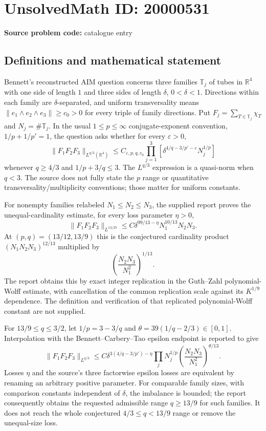 \documentclass[11pt]{article}
\newcommand{\R}{\mathbb{R}}
\begin{document}
\section*{UnsolvedMath ID: 20000531}
\textbf{Source problem code:} catalogue entry
\subsection{Definitions and mathematical statement}
Bennett's reconstructed AIM question concerns three families $\mathbb T_j$ of tubes in $\R^4$ with one side of length $1$ and three sides of length $\delta$, $0<\delta<1$. Directions within each family are $\delta$-separated, and uniform transversality means $\|e_1\wedge e_2\wedge e_3\|\geq c_0>0$ for every triple of family directions. Put $F_j=\sum_{T\in\mathbb T_j}\chi_T$ and $N_j=\#\mathbb T_j$. In the usual $1\leq p\leq\infty$ conjugate-exponent convention, $1/p+1/p'=1$, the question asks whether for every $\varepsilon>0$,
\[
 \|F_1F_2F_3\|_{L^{q/3}(\R^4)}\leq C_{\varepsilon,p,q,c_0}
 \prod_{j=1}^3\left[\delta^{4/q-3/p'-\varepsilon}N_j^{1/p}\right]
\]
whenever $q\geq4/3$ and $1/p+3/q\leq3$. The $L^{q/3}$ expression is a quasi-norm when $q<3$. The source does not fully state the $p$ range or quantitative transversality/multiplicity conventions; those matter for uniform constants.

For nonempty families relabeled $N_1\leq N_2\leq N_3$, the supplied report proves the unequal-cardinality estimate, for every loss parameter $\eta>0$,
\[
 \|F_1F_2F_3\|_{L^{13/27}}
 \leq C\delta^{99/13-\eta}N_1^{10/13}N_2N_3.
\]
At $(p,q)=(13/12,13/9)$ this is the conjectured cardinality product $(N_1N_2N_3)^{12/13}$ multiplied by
\[
 \left(\frac{N_2N_3}{N_1^2}\right)^{1/13}.
\]
The report obtains this by exact integer replication in the Guth--Zahl polynomial-Wolff estimate, with cancellation of the common replication scale against its $K^{1/9}$ dependence. The definition and verification of that replicated polynomial-Wolff constant are not supplied.

For $13/9\leq q\leq3/2$, let $1/p=3-3/q$ and $\theta=39(1/q-2/3)\in[0,1]$. Interpolation with the Bennett--Carbery--Tao epsilon endpoint is reported to give
\[
 \|F_1F_2F_3\|_{L^{q/3}}\leq C\delta^{3(4/q-3/p')-\eta}
 \prod_jN_j^{1/p}\left(\frac{N_2N_3}{N_1^2}\right)^{\theta/13}.
\]
Losses $\eta$ and the source's three factorwise epsilon losses are equivalent by renaming an arbitrary positive parameter. For comparable family sizes, with comparison constants independent of $\delta$, the imbalance is bounded; the report consequently obtains the requested admissible range $q\geq13/9$ for such families. It does not reach the whole conjectured $4/3\leq q<13/9$ range or remove the unequal-size loss.
\end{document}
